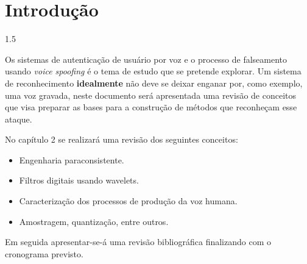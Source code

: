 \documentclass[a4paper,12pt,openright,oneside]{book}
\newenvironment{myenv}[1]
  {\begin{spacing}{#1}}
  {\end{spacing}}
\begin{document}
	\mainmatter
	\setlength{\parindent}{1.25cm}

	\chapter{Introdução}
		\begin{myenv}{1.5}
			\setcounter{page}{12}
			\par Os sistemas de autenticação de usuário por voz e o processo de falseamento usando \textit{voice spoofing} é o tema de estudo que se pretende explorar. Um sistema de reconhecimento \textbf{idealmente} não deve se deixar enganar por, como exemplo, uma voz gravada, neste documento será apresentada uma revisão de conceitos que visa preparar as bases para a construção de métodos que reconheçam esse ataque.
			
			\par No capítulo 2 se realizará uma revisão dos seguintes conceitos:
			\begin{itemize}
				\item Engenharia paraconsistente.
				\item Filtros digitais usando wavelets.
				\item Caracterização dos processos de produção da voz humana.
				\item Amostragem, quantização, entre outros.
			\end{itemize}
			\par Em seguida apresentar-se-á uma revisão bibliográfica finalizando com o cronograma previsto.
		\end{myenv}
\end{document}
